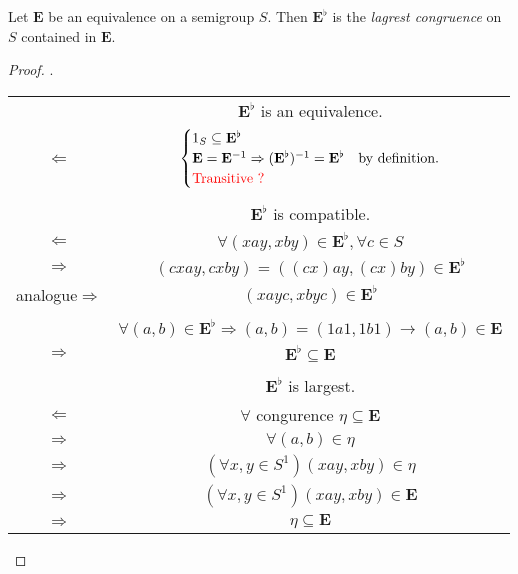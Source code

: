\begin{Prop}\label{Prop:1.5.10}
    Let $\mathbf{E}$ be an equivalence on a semigroup $S$. Then $\mathbf{E}^\flat$ is the \emph{lagrest congruence} on $S$ contained in $\mathbf{E}$.
    \begin{proof}.
        \begin{center}
            \begin{tabular}{c c}
                & $\mathbf{E}^{\flat}$ is an equivalence.   \\
                $\Leftarrow$ & 
                $\begin{cases}
                    1_S \subseteq \mathbf{E}^{\flat}  \\
                    \mathbf{E} = \mathbf{E}^{-1} \Rightarrow (\mathbf{E}^{\flat})^{-1} = \mathbf{E}^{\flat} & \text{by definition.} \\
                    \textcolor{red}{\text{Transitive ?}} \\
                \end{cases}$    \\  \\
                & $\mathbf{E}^{\flat}$ is compatible.     \\
                $\Leftarrow$ & $\forall (xay, xby) \in \mathbf{E}^{\flat}, \forall c \in S$ \\
                $\Rightarrow $ & $(cxay, cxby) = ((cx)ay, (cx)by) \in \mathbf{E}^{\flat}$     \\
                analogue$\Rightarrow $ & $(xayc, xbyc) \in \mathbf{E}^{\flat}$  \\
                \\
                & $\forall (a, b)\in \mathbf{E}^{\flat} \Rightarrow (a, b) = (1a1,1b1) \rightarrow (a, b) \in \mathbf{E}$  \\
                $\Rightarrow $ & $\mathbf{E}^{\flat} \subseteq \mathbf{E}$ \\ \\
                & $\mathbf{E}^{\flat}$ is largest.  \\
                $\Leftarrow$ & $\forall$ congurence $\eta \subseteq \mathbf{E}$  \\
                $\Rightarrow $ & $\forall (a, b) \in \eta$  \\
                $\Rightarrow $ & $(\forall x,y \in S^1)(xay, xby) \in \eta$ \\
                $\Rightarrow $ & $(\forall x,y \in S^1)(xay, xby) \in \mathbf{E}$   \\
                $\Rightarrow $ & $\eta \subseteq \mathbf{E}$
            \end{tabular}
        \end{center}
    \end{proof}
\end{Prop}

